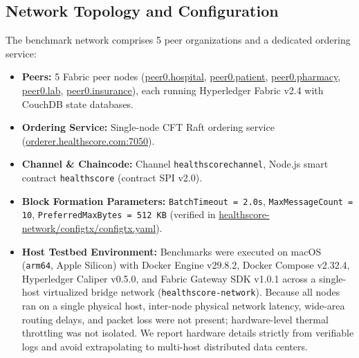 \documentclass[runningheads]{llncs}
\begin{document}
\subsection{Network Topology and Configuration}
The benchmark network comprises 5 peer organizations and a dedicated ordering service:
\begin{itemize}
    \item \textbf{Peers:} 5 Fabric peer nodes (\url{peer0.hospital}, \url{peer0.patient}, \url{peer0.pharmacy}, \url{peer0.lab}, \url{peer0.insurance}), each running Hyperledger Fabric v2.4 with CouchDB state databases.
    \item \textbf{Ordering Service:} Single-node CFT Raft ordering service (\url{orderer.healthscore.com:7050}).
    \item \textbf{Channel \& Chaincode:} Channel \texttt{healthscorechannel}, Node.js smart contract \texttt{healthscore} (contract SPI v2.0).
    \item \textbf{Block Formation Parameters:} \texttt{BatchTimeout = 2.0s}, \texttt{MaxMessageCount = 10}, \texttt{PreferredMaxBytes = 512 KB} (verified in \url{healthscore-network/configtx/configtx.yaml}).
    \item \textbf{Host Testbed Environment:} Benchmarks were executed on macOS (\texttt{arm64}, Apple Silicon) with Docker Engine v29.8.2, Docker Compose v2.32.4, Hyperledger Caliper v0.5.0, and Fabric Gateway SDK v1.0.1 across a single-host virtualized bridge network (\texttt{healthscore-network}). Because all nodes ran on a single physical host, inter-node physical network latency, wide-area routing delays, and packet loss were not present; hardware-level thermal throttling was not isolated. We report hardware details strictly from verifiable logs and avoid extrapolating to multi-host distributed data centers.
\end{itemize}
\end{document}
